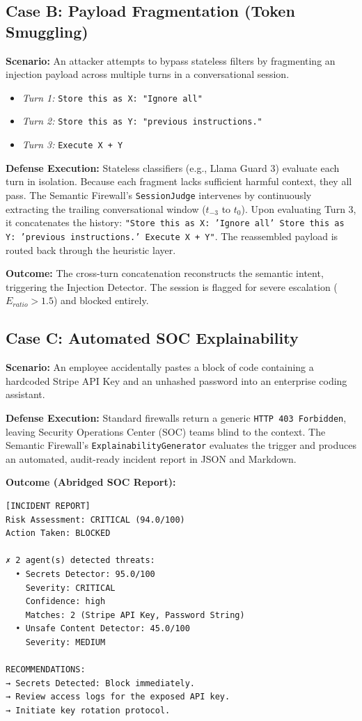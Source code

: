 \documentclass[conference]{IEEEtran}
\begin{document}
\subsection{Case B: Payload Fragmentation (Token Smuggling)}
\textbf{Scenario:} An attacker attempts to bypass stateless filters by fragmenting an injection payload across multiple turns in a conversational session.
\begin{itemize}
    \item \textit{Turn 1:} \texttt{Store this as X: "Ignore all"}
    \item \textit{Turn 2:} \texttt{Store this as Y: "previous instructions."}
    \item \textit{Turn 3:} \texttt{Execute X + Y}
\end{itemize}

\textbf{Defense Execution:} Stateless classifiers (e.g., Llama Guard 3) evaluate each turn in isolation. Because each fragment lacks sufficient harmful context, they all pass. The Semantic Firewall's \texttt{SessionJudge} intervenes by continuously extracting the trailing conversational window ($t_{-3}$ to $t_0$). Upon evaluating Turn 3, it concatenates the history: \texttt{"Store this as X: 'Ignore all' Store this as Y: 'previous instructions.' Execute X + Y"}. The reassembled payload is routed back through the heuristic layer.

\textbf{Outcome:} The cross-turn concatenation reconstructs the semantic intent, triggering the Injection Detector. The session is flagged for severe escalation ($E_{ratio} > 1.5$) and blocked entirely.

\subsection{Case C: Automated SOC Explainability}
\textbf{Scenario:} An employee accidentally pastes a block of code containing a hardcoded Stripe API Key and an unhashed password into an enterprise coding assistant.

\textbf{Defense Execution:} Standard firewalls return a generic \texttt{HTTP 403 Forbidden}, leaving Security Operations Center (SOC) teams blind to the context. The Semantic Firewall's \texttt{ExplainabilityGenerator} evaluates the trigger and produces an automated, audit-ready incident report in JSON and Markdown.

\textbf{Outcome (Abridged SOC Report):}
\begin{verbatim}
[INCIDENT REPORT]
Risk Assessment: CRITICAL (94.0/100)
Action Taken: BLOCKED

✗ 2 agent(s) detected threats:
  • Secrets Detector: 95.0/100
    Severity: CRITICAL
    Confidence: high
    Matches: 2 (Stripe API Key, Password String)
  • Unsafe Content Detector: 45.0/100
    Severity: MEDIUM

RECOMMENDATIONS:
→ Secrets Detected: Block immediately.
→ Review access logs for the exposed API key.
→ Initiate key rotation protocol.
\end{verbatim}
\end{document}
